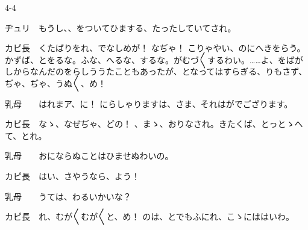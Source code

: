 \documentclass[tate,paper=b6j,jafontsize=9pt]{jlreq}
\begin{document}
\begin{azconvIndented}{4\zw}{-4\zw}

ヂュリ　もうし、、をついてひまする、たったしていてされ。

カピ長　くたばりをれ、でなしめが！ なぢゃ！ こりゃやい、のにへきをらう。かずば、とをるな。ふな、へるな、するな。がむづ{〳〵}するわい。……よ、をばがしからなんだのをらしううたこともあったが、となってはすらぎる、りもさず、ぢゃ、ぢゃ、うぬ{〳〵}、め！

乳母　　はれまア、に！ にらしゃりますは、さま、それはがでござります。

カピ長　なゝ、なぜぢゃ、どの！ 、まゝ、おりなされ。きたくば、とっとゝへて、とれ。

乳母　　おにならぬことはひませぬわいの。

カピ長　はい、さやうなら、よう！

乳母　　うては、わるいかいな？

カピ長　れ、むが{〳〵}むが{〳〵}と、め！ のは、とでもふにれ、こゝにははいわ。


\end{azconvIndented}
\end{document}
